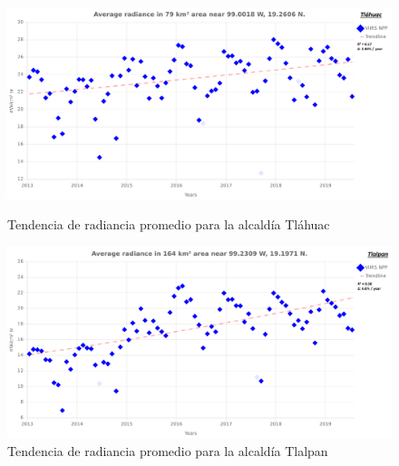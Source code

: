 \begin{figure}[H]
  \centering
    \includegraphics[width=1\textwidth]{TLAH}
  \caption{Tendencia de radiancia promedio para la alcaldía Tláhuac}
  \label{radiancetrendstlah}
\vspace{20mm} 
    \includegraphics[width=1\textwidth]{TLA}
  \caption{Tendencia de radiancia promedio para la alcaldía Tlalpan}
  \label{radiancetrendstla}
\end{figure}
\blindtext

\newpage

